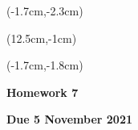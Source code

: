 \documentclass[12pt, oneside]{article}
\begin{document}
\begin{textblock*}{4cm}(-1.7cm,-2.3cm)
\end{textblock*}

\begin{textblock*}{8cm}(12.5cm,-1cm)
\end{textblock*}
\begin{textblock*}{13.5cm}(-1.7cm,-1.8cm)
\end{textblock*}

\vspace{1cm}

\begin{center}
\textbf{\Large Homework 7}

\textbf{Due 5 November 2021}
\end{center}
\end{document}
